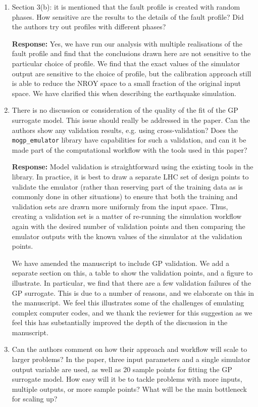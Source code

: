 \documentclass{article}
\begin{document}
\begin{enumerate}
\item Section 3(b): it is mentioned that the fault profile is created with random phases. How sensitive are the results to the details of the fault profile? Did the authors try out profiles with different phases?

  \textbf{Response:} Yes, we have run our analysis with multiple realisations
  of the fault profile and find that the conclusions drawn here are not
  sensitive to the particular choice of profile. We find that the exact
  values of the simulator output are sensitive to the choice of profile,
  but the calibration approach still is able to reduce the NROY space to
  a small fraction of the original input space. We have clarified this
  when describing the earthquake simulation.

\item There is no discussion or consideration of the quality of the fit of the GP surrogate model. This issue should really be addressed in the paper. Can the authors show any validation results, e.g. using cross-validation? Does the \texttt{mogp\_emulator} library have capabilities for such a validation, and can it be made part of the computational workflow with the tools used in this paper?

  \textbf{Response:} Model validation is straightforward using the existing
  tools in the library. In practice, it is best to draw a separate LHC set
  of design points to validate the emulator (rather than reserving part
  of the training data as is commonly done in other situations) to ensure
  that both the training and validation sets are drawn more uniformly from
  the input space. Thus, creating a validation set is a matter of re-running
  the simulation workflow again with the desired number of validation points
  and then comparing the emulator outputs with the known values of the
  simulator at the validation points.

  We have amended the manuscript to include GP validation. We add a separate
  section on this, a table to show the validation points, and a figure to
  illustrate. In particular,
  we find that there are a few validation failures of the GP surrogate.
  This is due to a number of reasons, and we elaborate on this in the manuscript.
  We feel this illustrates some of the challenges of
  emulating complex computer codes, and we thank the reviewer for this
  suggestion as we feel this has substantially improved the depth of
  the discussion in the manuscript.

\item Can the authors comment on how their approach and workflow will scale to larger problems? In the paper, three input parameters and a single simulator output variable are used, as well as 20 sample points for fitting the GP surrogate model. How easy will it be to tackle problems with more inputs, multiple outputs, or more sample points? What will be the main bottleneck for scaling up?


\end{enumerate}
\end{document}

